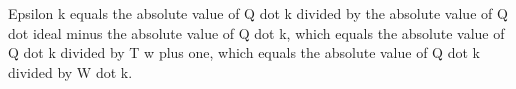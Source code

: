 Epsilon k equals the absolute value of Q dot k divided by the absolute value of Q dot ideal minus the absolute value of Q dot k, which equals the absolute value of Q dot k divided by T w plus one, which equals the absolute value of Q dot k divided by W dot k.
